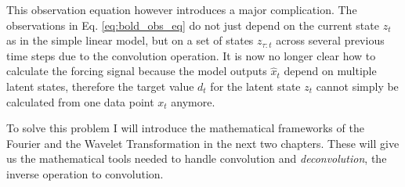 This observation equation however introduces a major complication. The observations in Eq. \ref{eq:bold_obs_eq} do not just depend on the current state $z_t$ as in the 
simple linear model, but on a set of states $z_{\tau:t}$ across several previous time steps due to the convolution operation. It is now no longer clear how to calculate the 
forcing signal because the model outputs $\hat{x}_t$ depend on multiple latent states, therefore the target value $d_t$ for the latent state $z_t$ cannot simply
be calculated from one data point $x_t$ anymore.

To solve this problem I will introduce the mathematical frameworks of the Fourier and the Wavelet Transformation in the next two chapters.
These will give us the mathematical tools needed to handle convolution and \textit{deconvolution}, the inverse operation to convolution.
